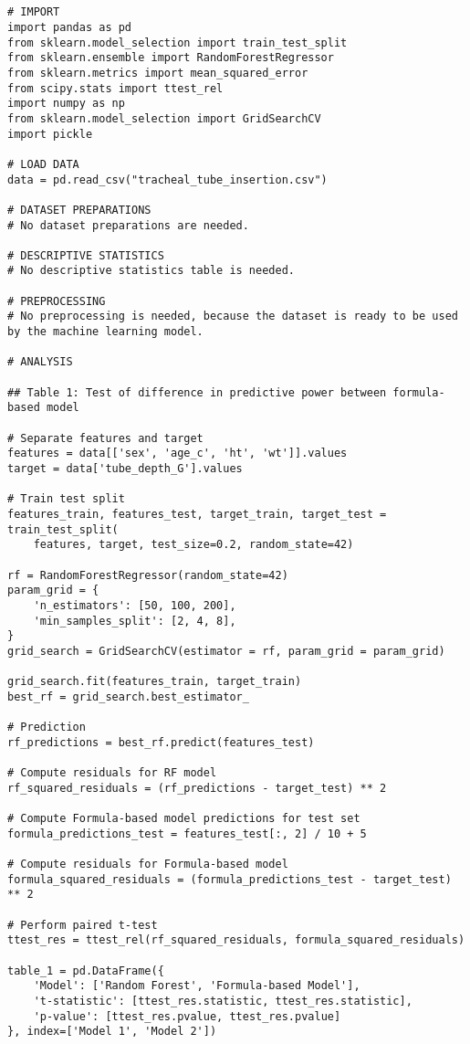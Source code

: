 \documentclass[11pt]{article}
\begin{document}
\begin{verbatim}


# IMPORT
import pandas as pd
from sklearn.model_selection import train_test_split
from sklearn.ensemble import RandomForestRegressor
from sklearn.metrics import mean_squared_error
from scipy.stats import ttest_rel
import numpy as np
from sklearn.model_selection import GridSearchCV
import pickle

# LOAD DATA
data = pd.read_csv("tracheal_tube_insertion.csv")

# DATASET PREPARATIONS
# No dataset preparations are needed.

# DESCRIPTIVE STATISTICS
# No descriptive statistics table is needed.

# PREPROCESSING
# No preprocessing is needed, because the dataset is ready to be used by the machine learning model.

# ANALYSIS

## Table 1: Test of difference in predictive power between formula-based model 

# Separate features and target
features = data[['sex', 'age_c', 'ht', 'wt']].values
target = data['tube_depth_G'].values

# Train test split
features_train, features_test, target_train, target_test = train_test_split(
    features, target, test_size=0.2, random_state=42)

rf = RandomForestRegressor(random_state=42)
param_grid = {
    'n_estimators': [50, 100, 200],
    'min_samples_split': [2, 4, 8],
}
grid_search = GridSearchCV(estimator = rf, param_grid = param_grid)

grid_search.fit(features_train, target_train)
best_rf = grid_search.best_estimator_

# Prediction
rf_predictions = best_rf.predict(features_test)

# Compute residuals for RF model
rf_squared_residuals = (rf_predictions - target_test) ** 2

# Compute Formula-based model predictions for test set
formula_predictions_test = features_test[:, 2] / 10 + 5

# Compute residuals for Formula-based model
formula_squared_residuals = (formula_predictions_test - target_test) ** 2

# Perform paired t-test
ttest_res = ttest_rel(rf_squared_residuals, formula_squared_residuals)

table_1 = pd.DataFrame({
    'Model': ['Random Forest', 'Formula-based Model'],
    't-statistic': [ttest_res.statistic, ttest_res.statistic],
    'p-value': [ttest_res.pvalue, ttest_res.pvalue]
}, index=['Model 1', 'Model 2'])


\end{verbatim}
\end{document}
